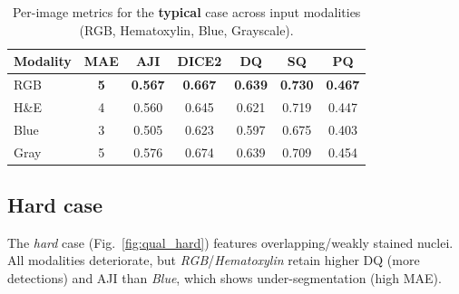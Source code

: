 \documentclass[target=bach,aauheader=,style=]{thud}
\begin{document}
\begin{table}[ht]
\centering
\caption{Per-image metrics for the \textbf{typical} case across input modalities (RGB, Hematoxylin, Blue, Grayscale). }
\label{tab:typical_metrics}
\begin{tabular}{lcccccc}
\toprule
Modality & MAE & AJI & DICE2 & DQ & SQ & PQ \\
\midrule
RGB  & \textbf{5} & \textbf{0.567} & \textbf{0.667} & \textbf{0.639} & \textbf{0.730} & \textbf{0.467} \\
H\&E & 4 & 0.560 & 0.645 & 0.621 & 0.719 & 0.447 \\
Blue & 3 & 0.505 & 0.623 & 0.597 & 0.675 & 0.403 \\
Gray & 5 & 0.576 & 0.674 & 0.639 & 0.709 & 0.454 \\
\bottomrule
\end{tabular}
\end{table}
\subsection{Hard case}
The \emph{hard} case (Fig.~\ref{fig:qual_hard}) features overlapping/weakly stained nuclei. All modalities deteriorate, but \emph{RGB}/\emph{Hematoxylin} retain higher DQ (more detections) and AJI than \emph{Blue}, which shows under-segmentation (high MAE).
\end{document}
